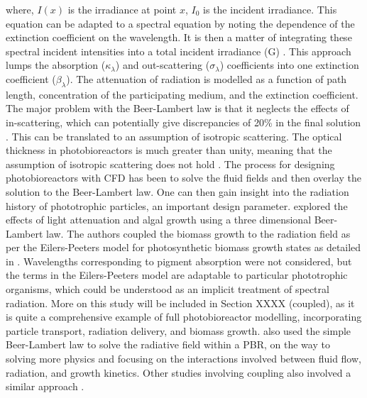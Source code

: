 where, $I(x)$ is the irradiance at point $x$, $I_0$ is the incident irradiance. This equation can be adapted to a spectral equation by noting the dependence of the extinction coefficient on the wavelength. It is then a matter of integrating these spectral incident intensities into a total incident irradiance (G) \cite{pottier2005}.
\skippingparagraph
This approach lumps the absorption ($\kappa_\lambda$) and out-scattering ($\sigma_\lambda$) coefficients into one extinction coefficient ($\beta_\lambda$). The attenuation of radiation is modelled as a function of path length, concentration of the participating medium, and the extinction coefficient. The major problem with the Beer-Lambert law is that it neglects the effects of in-scattering, which can potentially give discrepancies of 20\% in the final solution \cite{berberoglu2007,pottier2005,wang2014a}. This can be translated to an assumption of isotropic scattering. The optical thickness in photobioreactors is much greater than unity, meaning that the assumption of isotropic scattering does not hold \cite{modest2003}.
\skippingparagraph
The process for designing photobioreactors with CFD has been to solve the fluid fields and then overlay the solution to the Beer-Lambert law. One can then gain insight into the radiation history of phototrophic particles, an important design parameter. \cite{marshall2010} explored the effects of light attenuation and algal growth using a three dimensional Beer-Lambert law. The authors coupled the biomass growth to the radiation field as per the Eilers-Peeters model for photosynthetic biomass growth states as detailed in \cite{bechet2013}. Wavelengths corresponding to pigment absorption were not considered, but the terms in the Eilers-Peeters model are adaptable to particular phototrophic organisms, which could be understood as an implicit treatment of spectral radiation. More on this study will be included in Section XXXX (coupled), as it is quite a comprehensive example of full photobioreactor modelling, incorporating particle transport, radiation delivery, and biomass growth. \cite{nauha2013} also used the simple Beer-Lambert law to solve the radiative field within a PBR, on the way to solving more physics and focusing on the interactions involved between fluid flow, radiation, and growth kinetics. Other studies involving coupling also involved a similar approach \cite{marshall2011}. 
\skippingparagraph
